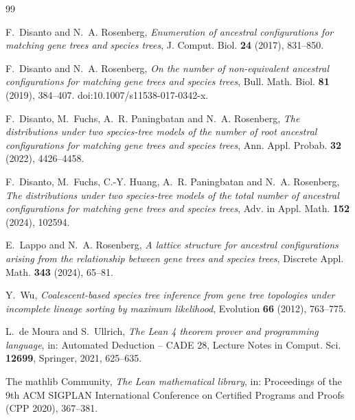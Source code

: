 \documentclass[11pt]{amsart}
\theoremstyle{definition}
\theoremstyle{remark}
\begin{document}
\begin{thebibliography}{99}

F.~Disanto and N.~A. Rosenberg,
\emph{Enumeration of ancestral configurations for matching gene trees and species trees},
J. Comput. Biol. \textbf{24} (2017), 831--850.

F.~Disanto and N.~A. Rosenberg,
\emph{On the number of non-equivalent ancestral configurations for matching gene trees and species trees},
Bull. Math. Biol. \textbf{81} (2019), 384--407. doi:10.1007/s11538-017-0342-x.

F.~Disanto, M.~Fuchs, A.~R. Paningbatan and N.~A. Rosenberg,
\emph{The distributions under two species-tree models of the number of root ancestral configurations for matching gene trees and species trees},
Ann. Appl. Probab. \textbf{32} (2022), 4426--4458.

F.~Disanto, M.~Fuchs, C.-Y. Huang, A.~R. Paningbatan and N.~A. Rosenberg,
\emph{The distributions under two species-tree models of the total number of ancestral configurations for matching gene trees and species trees},
Adv. in Appl. Math. \textbf{152} (2024), 102594.

E.~Lappo and N.~A. Rosenberg,
\emph{A lattice structure for ancestral configurations arising from the relationship between gene trees and species trees},
Discrete Appl. Math. \textbf{343} (2024), 65--81.

Y.~Wu,
\emph{Coalescent-based species tree inference from gene tree topologies under incomplete lineage sorting by maximum likelihood},
Evolution \textbf{66} (2012), 763--775.

L.~de Moura and S.~Ullrich,
\emph{The Lean 4 theorem prover and programming language},
in: Automated Deduction -- CADE 28, Lecture Notes in Comput. Sci. \textbf{12699}, Springer, 2021, 625--635.

The mathlib Community,
\emph{The Lean mathematical library},
in: Proceedings of the 9th ACM SIGPLAN International Conference on Certified Programs and Proofs (CPP 2020), 367--381.

\end{thebibliography}
\end{document}
